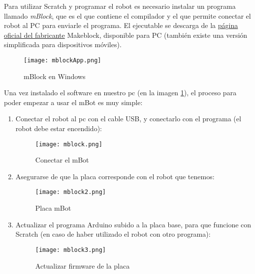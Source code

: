 Para utilizar Scratch y programar el robot es necesario instalar un programa llamado \textit{mBlock}, que es el que contiene el compilador y el que permite conectar el robot al PC para enviarle el programa. El ejecutable se descarga de la \href{https://www.makeblock.es/blog/descargas/}{página oficial del fabricante} Makeblock, disponible para PC (también existe una versión simplificada para dispositivos móviles).\\
\begin{figure}[h]
	\texttt{[image: mblockApp.png]}
	\centering
	\caption{mBlock en Windows}
	\label{img:mblockApp}
\end{figure}
Una vez instalado el software en nuestro pc (en la imagen \ref{img:mblockApp}), el proceso para poder empezar a usar el mBot es muy simple:
\begin{enumerate}\label{list:conexionMblock}
	\item Conectar el robot al pc con el cable USB, y conectarlo con el programa (el robot debe estar encendido):
	\begin{figure}[H]
		\texttt{[image: mblock.png]}
		\centering
		\label{img:mblock}
		\caption{Conectar el mBot}
	\end{figure}

	\item  Asegurarse de que la placa corresponde con el robot que tenemos:
	\begin{figure}[H]
		\texttt{[image: mblock2.png]}
		\centering
		\label{img:mblock2}
		\caption{Placa mBot}
	\end{figure}

	\item Actualizar el programa Arduino subido a la placa base, para que funcione con Scratch (en caso de haber utilizado el robot con otro programa):
	\begin{figure}[H]
		\texttt{[image: mblock3.png]}
		\centering
		\label{img:mblock3}
		\caption{Actualizar firmware de la placa}
	\end{figure}


\end{enumerate}
